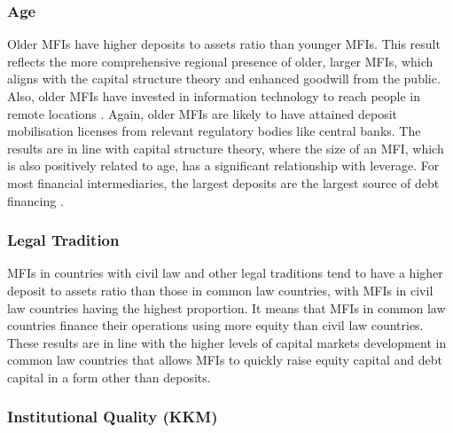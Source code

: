 \documentclass[a4paper, nobind]{templates/ociamthesis}
\begin{document}
\hypertarget{age-3}{%
\subsubsection{Age}\label{age-3}}

Older MFIs have higher deposits to assets ratio than younger MFIs. This result reflects the more comprehensive regional presence of older, larger MFIs, which aligns with the capital structure theory \autocite{barclay2005capital,barclay2006debt} and enhanced goodwill from the public. Also, older MFIs have invested in information technology to reach people in remote locations \autocite{di2021technology}. Again, older MFIs are likely to have attained deposit mobilisation licenses from relevant regulatory bodies like central banks. The results are in line with capital structure theory, where the size of an MFI, which is also positively related to age, has a significant relationship with leverage. For most financial intermediaries, the largest deposits are the largest source of debt financing \autocite{gale2020bank}.

\hypertarget{legal-tradition-2}{%
\subsubsection{Legal Tradition}\label{legal-tradition-2}}

MFIs in countries with civil law and other legal traditions tend to have a higher deposit to assets ratio than those in common law countries, with MFIs in civil law countries having the highest proportion. It means that MFIs in common law countries finance their operations using more equity than civil law countries. These results are in line with the higher levels of capital markets development in common law countries \autocite{la2013law,schnyder2018twenty} that allows MFIs to quickly raise equity capital and debt capital in a form other than deposits.

\hypertarget{institutional-quality-kkm-1}{%
\subsubsection{Institutional Quality (KKM)}\label{institutional-quality-kkm-1}}
\end{document}

